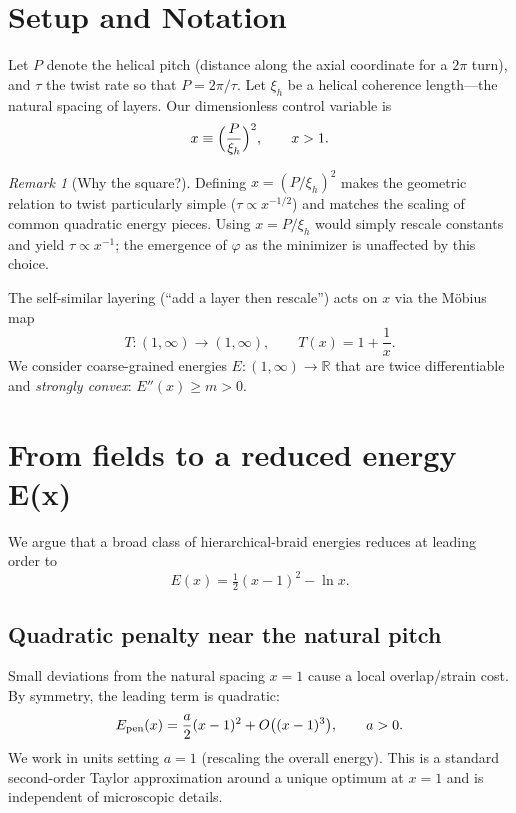 \documentclass[11pt]{article}
\theoremstyle{remark}
\newtheorem{remark}{Remark}
\theoremstyle{definition}
\newcommand{\R}{\mathbb{R}}
\newcommand{\ph}{\varphi}
\begin{document}
\section{Setup and Notation}
Let $P$ denote the helical pitch (distance along the axial coordinate for a $2\pi$ turn), and $\tau$ the twist rate so that $P=2\pi/\tau$. Let $\xi_h$ be a helical coherence length---the natural spacing of layers. Our dimensionless control variable is
\begin{equation}
 x \equiv \Bigl(\frac{P}{\xi_h}\Bigr)^2, \qquad x>1.
 \label{eq:defx}
\end{equation}
\begin{remark}[Why the square?]
Defining $x=(P/\xi_h)^2$ makes the geometric relation to twist particularly simple ($\tau\propto x^{-1/2}$) and matches the scaling of common quadratic energy pieces. Using $x=P/\xi_h$ would simply rescale constants and yield $\tau\propto x^{-1}$; the emergence of $\ph$ as the minimizer is unaffected by this choice.
\end{remark}
The self-similar layering (``add a layer then rescale'') acts on $x$ via the M\"obius map
\begin{equation}
 T:(1,\infty)\to(1,\infty),\qquad T(x)=1+\frac{1}{x}.
 \label{eq:Tmap}
\end{equation}
We consider coarse-grained energies $E:(1,\infty)\to\R$ that are twice differentiable and \emph{strongly convex}: $E''(x)\ge m>0$.

\section{From fields to a reduced energy E(x)}
We argue that a broad class of hierarchical-braid energies reduces at leading order to
\begin{equation}
 E(x)=\tfrac12(x-1)^2-\ln x.
 \label{eq:Ex}
\end{equation}
\subsection{Quadratic penalty near the natural pitch}
Small deviations from the natural spacing $x=1$ cause a local overlap/strain cost. By symmetry, the leading term is quadratic:
\begin{equation}
 E_{\rm pen}(x)=\frac{a}{2}(x-1)^2+O\bigl((x-1)^3\bigr),\qquad a>0.
\end{equation}
We work in units setting $a=1$ (rescaling the overall energy). This is a standard second-order Taylor approximation around a unique optimum at $x=1$ and is independent of microscopic details.
\end{document}
